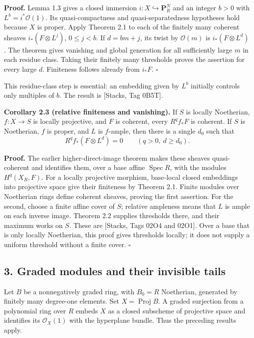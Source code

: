 \documentclass[11pt]{article}
\begin{document}
\textbf{Proof.} Lemma 1.3 gives a closed immersion
\(i:X\hookrightarrow\mathbf P_R^N\) and an integer \(b>0\) with
\(L^b=i^*\mathcal O(1)\). Its quasi-compactness and quasi-separatedness
hypotheses hold because \(X\) is proper. Apply Theorem 2.1 to each of
the finitely many coherent sheaves \(i_*(F\otimes L^j)\), \(0\le j<b\).
If \(d=bm+j\), its twist by \(\mathcal O(m)\) is \(i_*(F\otimes L^d)\).
The theorem gives vanishing and global generation for all sufficiently
large \(m\) in each residue class. Taking their finitely many thresholds
proves the assertion for every large \(d\). Finiteness follows already
from \(i_*F\). \(\square\)

This residue-class step is essential: an embedding given by \(L^b\)
initially controls only multiples of \(b\). The result is {[}Stacks, Tag
0B5T{]}.

\textbf{Corollary 2.3 (relative finiteness and vanishing).} If \(S\) is
locally Noetherian, \(f:X\to S\) is locally projective, and \(F\) is
coherent, every \(R^qf_*F\) is coherent. If \(S\) is Noetherian, \(f\)
is proper, and \(L\) is \(f\)-ample, then there is a single \(d_0\) such
that \[
R^qf_*(F\otimes L^d)=0\qquad(q>0,\ d\ge d_0).
\]

\textbf{Proof.} The earlier higher-direct-image theorem makes these
sheaves quasi-coherent and identifies them, over a base affine
\(\operatorname{Spec}R\), with the modules \(H^q(X_R,F)\). For a locally
projective morphism, base-local closed embeddings into projective space
give their finiteness by Theorem 2.1. Finite modules over Noetherian
rings define coherent sheaves, proving the first assertion. For the
second, choose a finite affine cover of \(S\); relative ampleness means
that \(L\) is ample on each inverse image. Theorem 2.2 supplies
thresholds there, and their maximum works on \(S\). These are {[}Stacks,
Tags 02O4 and 02O1{]}. Over a base that is only locally Noetherian, this
proof gives thresholds locally; it does not supply a uniform threshold
without a finite cover. \(\square\)

\subsection{3. Graded modules and their invisible
tails}\label{graded-modules-and-their-invisible-tails}

Let \(B\) be a nonnegatively graded ring, with \(B_0=R\) Noetherian,
generated by finitely many degree-one elements. Set
\(X=\operatorname{Proj}B\). A graded surjection from a polynomial ring
over \(R\) embeds \(X\) as a closed subscheme of projective space and
identifies its \(\mathcal O_X(1)\) with the hyperplane bundle. Thus the
preceding results apply.
\end{document}
